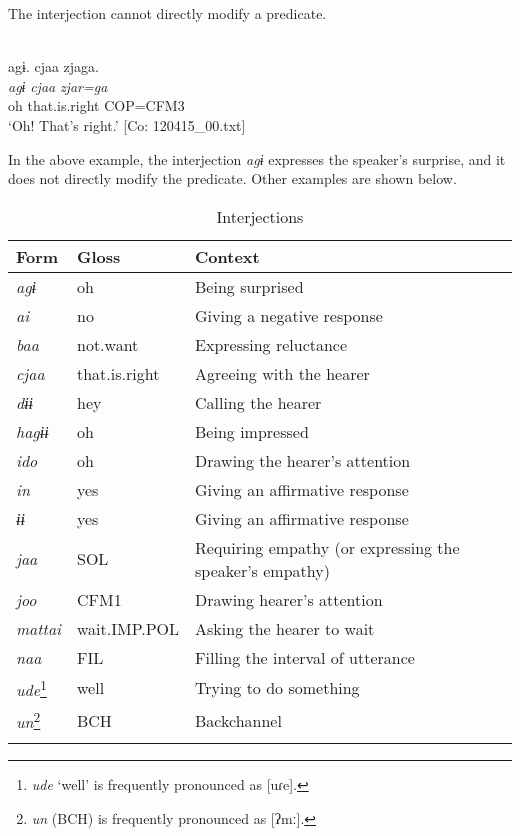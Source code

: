 The interjection cannot directly modify a predicate.

\ea{}\label{ex:4.56}\\
\glll    agɨ.  cjaa  zjaga.  \\
    \textit{agɨ}  \textit{cjaa}  \textit{zjar=ga}  \\
    oh  that.is.right  COP=CFM3  \\
  \glt     ‘Oh! That’s right.’ [Co: 120415\_00.txt]
\z

In the above example, the interjection \textit{agɨ} expresses the speaker’s surprise, and it does not directly modify the predicate. Other examples are shown below.

\begin{table}
\caption{\label{tab:29}Interjections}
\begin{tabular}{lll}
\lsptoprule
Form & Gloss & Context\\\midrule
\textit{agɨ}   & oh              & Being surprised\\
\textit{ai}    & no              & Giving a negative response\\
\textit{baa}   & not.want        & Expressing reluctance\\
\textit{cjaa}  &  that.is.right  & Agreeing with the hearer\\
\textit{dɨɨ}   & hey             & Calling the hearer\\
\textit{hagɨɨ} & oh            & Being impressed\\
\textit{ido}   & oh              & Drawing the hearer’s attention\\
\textit{in}    & yes              & Giving an affirmative response\\
\textit{ɨɨ}    & yes              & Giving an affirmative response\\
\textit{jaa}   & SOL             & Requiring empathy (or expressing the speaker’s empathy)\\
\textit{joo}   & CFM1            & Drawing hearer’s attention\\
\textit{mattai} &  wait.IMP.POL & Asking the hearer to wait\\
\textit{naa}   & FIL             & Filling the interval of utterance\\
\textit{ude}\footnote{\textit{ude} ‘well’ is frequently pronounced as [uɾe].} & well & Trying to do something\\
\textit{un}\footnote{\textit{un} (BCH) is frequently pronounced as [ʔmː].}    & BCH   &Backchannel\\
\lspbottomrule
\end{tabular}
\end{table}

